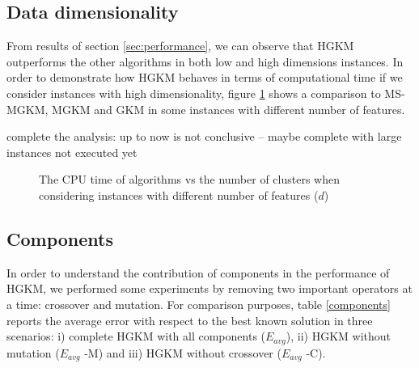\subsection{Data dimensionality}
From results of section \ref{sec:performance}, we can observe that HGKM outperforms the other algorithms in both low and high dimensions instances. In order to demonstrate how HGKM behaves in terms of computational time if we consider instances with high dimensionality, figure \ref{fig:dimen} shows a comparison to MS-MGKM, MGKM and GKM in some instances with different number of features.

\noindent [TO-DO] complete the analysis: up to now is not conclusive -- maybe complete with large instances not executed yet

\begin{figure}[H]
\centering
{}
\caption{The CPU time of algorithms vs the number of clusters when considering instances with different number of features ($d$)}
\label{fig:dimen}
\end{figure}

\subsection{Components}
\label{sec:components}
In order to understand the contribution of components in the performance of HGKM, we performed some experiments by removing two important operators at a time: crossover and mutation. For comparison purposes, table \ref{components} reports the average error with respect to the best known solution in three scenarios: i) complete HGKM with all components ($E_{avg}$), ii) HGKM without mutation ($E_{avg}$ -M) and iii) HGKM without crossover ($E_{avg}$ -C).

